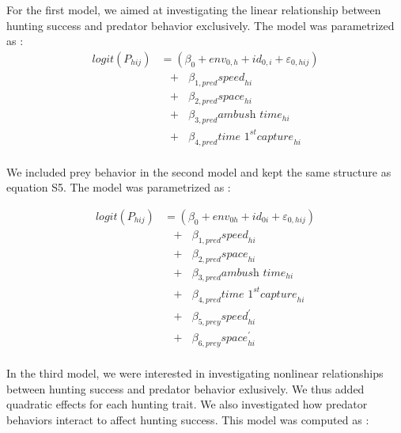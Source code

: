 \documentclass[
  11pt,
]{article}
\begin{document}
For the first model, we aimed at investigating the linear relationship
between hunting success and predator behavior exclusively. The model was
parametrized as : \[
\begin{aligned}
logit (P_{hij}) &= (\beta_{0} + env_{0,h} + id_{0,i} + \varepsilon_{0,hij}) \\
&\text{ } + \text{ } \beta_{1,pred} \textit{speed}_{hi} \\
&\text{ } + \text{ } \beta_{2,pred} \textit{space}_{hi} \\
&\text{ } + \text{ } \beta_{3,pred} \textit{ambush time}_{hi} \\
&\text{ } + \text{ } \beta_{4,pred} \textit{time 1}^{st} \textit{capture}_{hi} \\
\end{aligned}
\tag{S5}
\]

We included prey behavior in the second model and kept the same
structure as equation S5. The model was parametrized as :

\[
\begin{aligned}
logit (P_{hij}) &= (\beta_{0} + env_{0h} + id_{0i} + \varepsilon_{0,hij}) \\
&\text{ } + \text{ } \beta_{1,pred} \textit{speed}_{hi} \\
&\text{ } + \text{ } \beta_{2,pred} \textit{space}_{hi} \\
&\text{ } + \text{ } \beta_{3,pred} \textit{ambush time}_{hi} \\
&\text{ } + \text{ } \beta_{4,pred} \textit{time 1}^{st} \textit{capture}_{hi} \\
&\text{ } + \text{ } \beta_{5,prey} \textit{speed}_{hi}^{'} \\
&\text{ } + \text{ } \beta_{6,prey} \textit{space}_{hi}^{'} \\
\end{aligned}
\tag{S6}
\]

\newpage

In the third model, we were interested in investigating nonlinear
relationships between hunting success and predator behavior exlusively.
We thus added quadratic effects for each hunting trait. We also
investigated how predator behaviors interact to affect hunting success.
This model was computed as :
\end{document}
